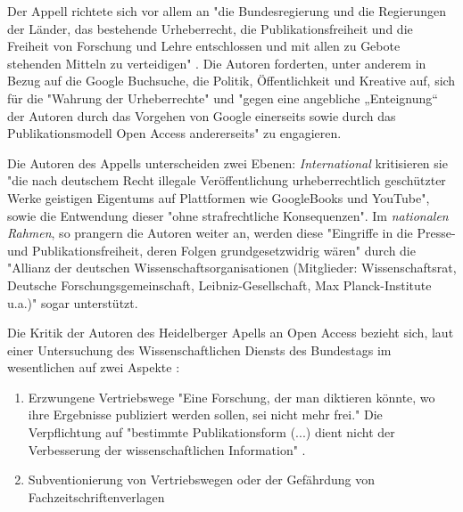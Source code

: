 Der Appell richtete sich vor allem an "die Bundesregierung und die Regierungen der Länder, das bestehende Urheberrecht, die Publikationsfreiheit und die Freiheit von Forschung und Lehre entschlossen und mit allen zu Gebote stehenden Mitteln zu verteidigen" \cite{ITK_2009}. Die Autoren forderten, unter anderem in Bezug auf die Google Buchsuche, die Politik, Öffentlichkeit und Kreative auf, sich für die "Wahrung der Urheberrechte" und "gegen eine angebliche „Enteignung“ der Autoren durch das Vorgehen von Google einerseits sowie durch das Publikationsmodell Open Access andererseits" \cite{WD_bundestag_2009} zu engagieren.

Die Autoren des Appells unterscheiden zwei Ebenen: \textit{International} kritisieren sie "die nach deutschem Recht illegale Veröffentlichung urheberrechtlich geschützter Werke geistigen Eigentums auf Plattformen wie GoogleBooks und YouTube", sowie die Entwendung dieser "ohne strafrechtliche Konsequenzen". Im \textit{nationalen Rahmen}, so prangern die Autoren weiter an, werden diese "Eingriffe in die Presse- und Publikationsfreiheit, deren Folgen grundgesetzwidrig wären" durch die "Allianz der deutschen Wissenschaftsorganisationen (Mitglieder: Wissenschaftsrat, Deutsche Forschungsgemeinschaft, Leibniz-Gesellschaft, Max Planck-Institute u.a.)" sogar unterstützt.\cite{ITK_2009}

Die Kritik der Autoren des Heidelberger Apells an Open Access bezieht sich, laut einer Untersuchung des Wissenschaftlichen Diensts des Bundestags im wesentlichen auf zwei Aspekte \cite{WD_bundestag_2009}:
\begin{enumerate}
\item Erzwungene Vertriebswege
"Eine Forschung, der man diktieren könnte, wo ihre Ergebnisse publiziert werden sollen, sei nicht mehr frei." Die Verpflichtung auf "bestimmte Publikationsform (...) dient nicht der Verbesserung der wissenschaftlichen Information" \cite{ITK_2009}.
\item Subventionierung von Vertriebswegen oder der Gefährdung von Fachzeitschriftenverlagen
\end{enumerate}


